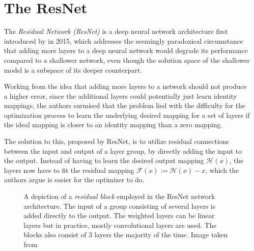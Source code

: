 \section{The ResNet}
\label{sec:resnet}

The \emph{Residual Network (ResNet)} is a deep neural network architecture first introduced by \cite{heDeepResidualLearning2015} in 2015, which addresses the seemingly paradoxical circumstance that adding more layers to a deep neural network would degrade its performance compared to a shallower network, even though the solution space of the shallower model is a subspace of its deeper counterpart. 

Working from the idea that adding more layers to a network should not produce a higher error, since the additional layers could potentially just learn identity mappings, the authors surmised that the problem lied with the difficulty for the optimization process to learn the underlying desired mapping for a set of layers if the ideal mapping is closer to an identity mapping than a zero mapping.

The solution to this, proposed by ResNet, is to utilize residual connections between the input and output of a layer group, by directly adding the input to the output. 
Instead of having to learn the desired output mapping $\mathcal{H}(x)$, the layers now have to fit the residual mapping $\mathcal{F}(x) := \mathcal{H}(x) - x$, which the authors argue is easier for the optimizer to do.

\begin{figure}[htbp]
    \caption{A depiction of a \emph{residual block} employed in the ResNet network architecture. The input of a group consisting of several layers is added directly to the output. The weighted layers can be linear layers but in practice, mostly convolutional layers are used. The blocks also consist of 3 layers the majority of the time. Image taken from \cite{heDeepResidualLearning2015}}
    \label{fig:resblock}
\end{figure}

